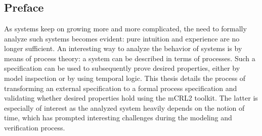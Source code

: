 \chapter*{} \vspace{-2cm} %

\section*{Preface}

As systems keep on growing more and more complicated, the need to formally analyze such systems becomes evident: pure intuition and experience are no longer sufficient. An interesting way to analyze the behavior of systems is by means of process theory: a system can be described in terms of processes. Such a specification can be used to subsequently prove desired properties, either by model inspection or by using temporal logic. This thesis details the process of transforming an external specification to a formal process specification and validating whether desired properties hold using the mCRL2 toolkit. The latter is especially of interest as the analyzed system heavily depends on the notion of time, which has prompted interesting challenges during the modeling and verification process.

